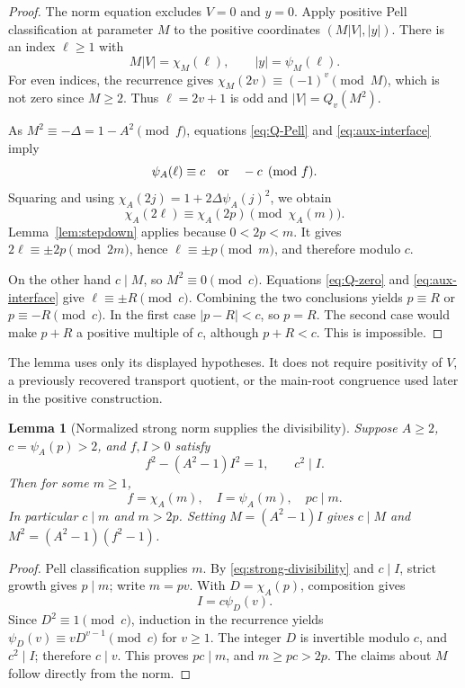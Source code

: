 \documentclass[11pt,a4paper]{article}
\newtheorem{lemma}[theorem]{Lemma}
\theoremstyle{definition}
\begin{document}
\begin{proof}
The norm equation excludes \(V=0\) and \(y=0\).  Apply positive Pell
classification at parameter \(M\) to the positive coordinates
\((M|V|,|y|)\).  There is an index \(\ell\ge1\) with
\[
 M|V|=\chi_M(\ell),\qquad |y|=\psi_M(\ell).
\]
For even indices, the recurrence gives
\(\chi_M(2v)\equiv(-1)^v\pmod M\), which is not zero since \(M\ge2\).
Thus \(\ell=2v+1\) is odd and
\(|V|=Q_v(M^2)\).

As \(M^2\equiv-\Delta=1-A^2\pmod f\), equations
\eqref{eq:Q-Pell} and \eqref{eq:aux-interface} imply
\[
 \psi_A(\ell)\equiv c\quad\hbox{or}\quad-c\pmod f.
\]
Squaring and using
\(\chi_A(2j)=1+2\Delta\psi_A(j)^2\), we obtain
\[
 \chi_A(2\ell)\equiv\chi_A(2p)\pmod{\chi_A(m)}.
\]
Lemma~\ref{lem:stepdown} applies because \(0<2p<m\).
It gives \(2\ell\equiv\pm2p\pmod{2m}\), hence
\(\ell\equiv\pm p\pmod m\), and therefore modulo \(c\).

On the other hand \(c\mid M\), so \(M^2\equiv0\pmod c\).
Equations \eqref{eq:Q-zero} and \eqref{eq:aux-interface} give
\(\ell\equiv\pm R\pmod c\).  Combining the two conclusions yields
\(p\equiv R\) or \(p\equiv-R\pmod c\).
In the first case \(|p-R|<c\), so \(p=R\).
The second case would make \(p+R\) a positive multiple of \(c\),
although \(p+R<c\).  This is impossible.
\end{proof}

The lemma uses only its displayed hypotheses.  It does not require
positivity of \(V\), a previously recovered transport quotient, or
the main-root congruence used later in the positive construction.

\begin{lemma}[Normalized strong norm supplies the divisibility]
\label{lem:normalized-strong}
Suppose \(A\ge2\), \(c=\psi_A(p)>2\), and \(f,I>0\) satisfy
\[
 f^2-(A^2-1)I^2=1,\qquad c^2\mid I.
\]
Then for some \(m\ge1\),
\[
 f=\chi_A(m),\quad I=\psi_A(m),\quad pc\mid m.
\]
In particular \(c\mid m\) and \(m>2p\).  Setting
\(M=(A^2-1)I\) gives \(c\mid M\) and
\(M^2=(A^2-1)(f^2-1)\).
\end{lemma}

\begin{proof}
Pell classification supplies \(m\).
By \eqref{eq:strong-divisibility} and \(c\mid I\), strict growth gives
\(p\mid m\); write \(m=pv\).  With \(D=\chi_A(p)\), composition gives
\[
 I=c\psi_D(v).
\]
Since \(D^2\equiv1\pmod c\), induction in the recurrence yields
\(\psi_D(v)\equiv vD^{v-1}\pmod c\) for \(v\ge1\).
The integer \(D\) is invertible modulo \(c\), and \(c^2\mid I\);
therefore \(c\mid v\).  This proves \(pc\mid m\), and
\(m\ge pc>2p\).  The claims about \(M\) follow directly from the norm.
\end{proof}
\end{document}
